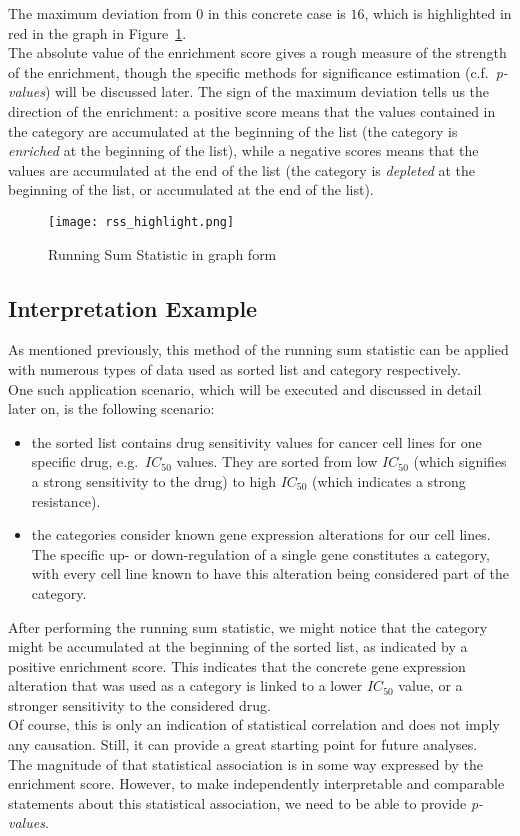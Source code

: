 The maximum deviation from $0$ in this concrete case is $16$, which is highlighted in red in the graph in Figure~\ref{fig:rss}.\\
The absolute value of the enrichment score gives a rough measure of the strength of the enrichment, though the specific methods for significance estimation (c.f.\ \textit{p-values}) will be discussed later. The sign of the maximum deviation tells us the direction of the enrichment: a positive score means that the values contained in the category are accumulated at the beginning of the list (the category is \textit{enriched} at the beginning of the list), while a negative scores means that the values are accumulated at the end of the list (the category is \textit{depleted} at the beginning of the list, or accumulated at the end of the list).
\begin{figure}
	\centering
	\texttt{[image: rss\_highlight.png]}
	\caption{Running Sum Statistic in graph form}
	\label{fig:rss}
\end{figure}

\subsection{Interpretation Example}\label{subsec:ea_example}
As mentioned previously, this method of the running sum statistic can be applied with numerous types of data used as sorted list and category respectively.\\
One such application scenario, which will be executed and discussed in detail later on, is the following scenario:
\begin{itemize}
	\item the sorted list contains drug sensitivity values for cancer cell lines for one specific drug, e.g.\ $IC_{50}$ values. They are sorted from low $IC_{50}$ (which signifies a strong sensitivity to the drug) to high $IC_{50}$ (which indicates a strong resistance).
	\item the categories consider known gene expression alterations for our cell lines. The specific up- or down-regulation of a single gene constitutes a category, with every cell line known to have this alteration being considered part of the category.
\end{itemize}
After performing the running sum statistic, we might notice that the category might be accumulated at the beginning of the sorted list, as indicated by a positive enrichment score. This indicates that the concrete gene expression alteration that was used as a category is linked to a lower $IC_{50}$ value, or a stronger sensitivity to the considered drug.\\
Of course, this is only an indication of statistical correlation and does not imply any causation. Still, it can provide a great starting point for future analyses.\\
The magnitude of that statistical association is in some way expressed by the enrichment score. However, to make independently interpretable and comparable statements about this statistical association, we need to be able to provide \emph{p-values}.

